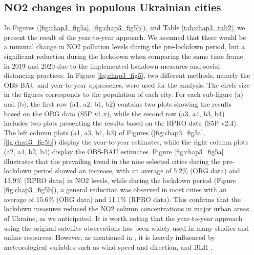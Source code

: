 \subsection{NO2 changes in populous Ukrainian cities}
In Figures (\ref{fig:chap3_fig5a}, \ref{fig:chap3_fig5b}), and Table \ref{tab:chap3_tab2}, we present the result of the year-to-year approach. We assumed that there would be a minimal change in NO2 pollution levels during the pre-lockdown period, but a significant reduction during the lockdown when comparing the same time frame in 2019 and 2020 due to the implemented lockdown measures and social distancing practices. In Figure \ref{fig:chap3_fig5}, two different methods, namely the OBS-BAU and year-to-year approaches, were used for the analysis. The circle size in the figures corresponds to the population of each city. For each sub-figure (a) and (b), the first row (a1, a2, b1, b2) contains two plots showing the results based on the ORG data (S5P v1.x), while the second row (a3, a4, b3, b4) includes two plots presenting the results based on the RPRO data (S5P v2.4). The left column plots (a1, a3, b1, b3) of Figures (\ref{fig:chap3_fig5a}, \ref{fig:chap3_fig5b}) display the year-to-year estimates, while the right column plots (a2, a4, b2, b4) display the OBS-BAU estimates. Figure \ref{fig:chap3_fig5a} illustrates that the prevailing trend in the nine selected cities during the pre-lockdown period showed an increase, with an average of 5.2\% (ORG data) and 13.9\% (RPRO data) in NO2 levels, while during the lockdown period (Figure \ref{fig:chap3_fig5b}), a general reduction was observed in most cities with an average of 15.6\% (ORG data) and 11.1\% (RPRO data). This confirms that the lockdown measures reduced the NO2 column concentrations in major urban areas of Ukraine, as we anticipated. It is worth noting that the year-to-year approach using the original satellite observations has been widely used in many studies and online resources. However, as mentioned in \citep{barre2021estimating,grange2021covid}, it is heavily influenced by meteorological variables such as wind speed and direction, and BLH \citep{wallace2009effect}.\par

